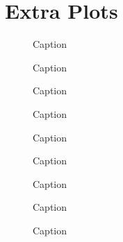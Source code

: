 \documentclass{article}
\begin{document}
    \appendix
    \section{Extra Plots}

    \begin{figure}[t]
        \centering
        
        \caption{Caption}
    \end{figure}

    \begin{figure}[t]
        \centering
        
        \caption{Caption}
    \end{figure}
    
    \begin{figure}[h]
        \centering
        
        \caption{Caption}
    \end{figure}

    \begin{figure}[h]
        \centering
        
        \caption{Caption}
    \end{figure}

    \begin{figure}[h]
        \centering
        
        \caption{Caption}
    \end{figure}
    
    \begin{figure}[h]
        \centering
        
        \caption{Caption}
    \end{figure}

    \begin{figure}[h]
        \centering
        
        \caption{Caption}
    \end{figure}

    \begin{figure}[h]
        \centering
        
        \caption{Caption}
    \end{figure}
    
    \begin{figure}[h]
        \centering
        
        \caption{Caption}
    \end{figure}
\end{document}
